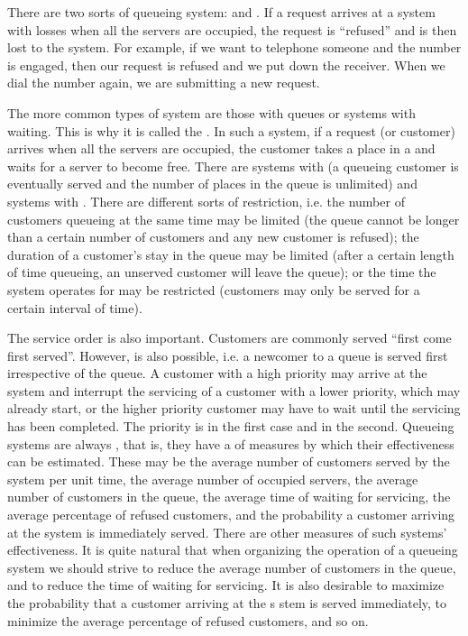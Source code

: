  There are two sorts of queueing system:  and . If a request arrives at a system with losses when all the servers are occupied, the request is ``refused'' and is then lost to the system. For example, if we want to telephone someone
and the number is engaged, then our request is refused and we put
down the receiver. When we dial the number again, we are submitting
a new request.

The more common types of system are those with queues or systems
with waiting. This is why it is called the . In such
a system, if a request (or customer) arrives when all the servers are
occupied, the customer takes a place in a  and waits for a server to become free. There are systems with  (a queueing customer is eventually served and the number of places in the queue is unlimited) and systems with . There are different sorts of restriction, i.e. the number of customers queueing at the same time may be limited (the queue cannot be longer than a certain number of customers and any new customer is refused); the duration of a customer's stay in the queue
may be limited (after a certain length of time queueing, an unserved
customer will leave the queue); or the time the system operates for may
be restricted (customers may only be served for a certain interval of
time).

The service order is also important. Customers are commonly served
``first come first served''. However,  is also
possible, i.e. a newcomer to a queue is served first irrespective of
the queue.  A customer with a high priority may arrive at the system
and interrupt the servicing of a customer with a lower priority, which
may already start, or the higher priority customer may have to wait
until the servicing has been completed. The priority is  in
the first case and  in the second. Queueing systems are always
, that is, they have a  of measures by which their effectiveness can be estimated. These may be the average number of
customers served by the system per unit time, the average number of
occupied servers, the average number of customers in the queue, the
average time of waiting for servicing, the average percentage of
refused customers, and the probability a customer arriving at the
system is immediately served. There are other measures of such
systems' effectiveness. It is quite natural that when organizing the
operation of a queueing system we should strive to reduce the average
number of customers in the queue, and to reduce the time of waiting
for servicing. It is also desirable to maximize the probability that a
customer arriving at the s stem is served immediately, to minimize the
average percentage of refused customers, and so on. 

